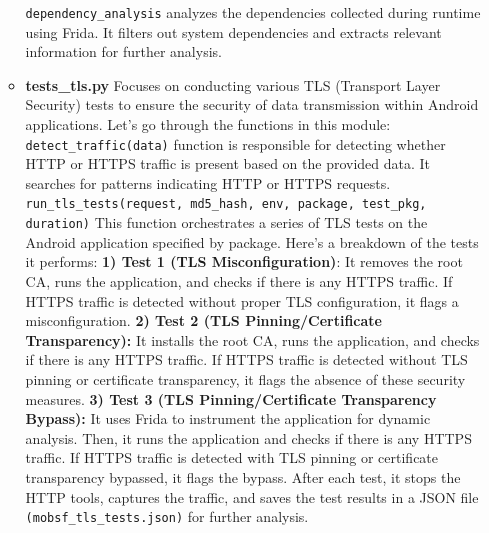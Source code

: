 \documentclass{report}
\begin{document}
\begin{itemize}
\begin{itemize}
        \texttt{dependency\_analysis} analyzes the dependencies collected during runtime using Frida. It filters out system dependencies and extracts relevant information for further analysis.
        \item \textbf {tests\_tls.py}
        Focuses on conducting various TLS (Transport Layer Security) tests to ensure the security of data transmission within Android applications. Let's go through the functions in this module:
        \texttt{detect\_traffic(data)} function is responsible for detecting whether HTTP or HTTPS traffic is present based on the provided data. It searches for patterns indicating HTTP or HTTPS requests. 
        \texttt{run\_tls\_tests(request, md5\_hash, env, package, test\_pkg, duration)} This function orchestrates a series of TLS tests on the Android application specified by package. Here's a breakdown of the tests it performs: \newline   
        \textbf{1) Test 1 (TLS Misconfiguration)}: It removes the root CA, runs the application, and checks if there is any HTTPS traffic. If HTTPS traffic is detected without proper TLS configuration, it flags a misconfiguration. \newline
        \textbf{2) Test 2 (TLS Pinning/Certificate Transparency):} It installs the root CA, runs the application, and checks if there is any HTTPS traffic. If HTTPS traffic is detected without TLS pinning or certificate transparency, it flags the absence of these security measures. \newline
        \textbf{3) Test 3 (TLS Pinning/Certificate Transparency Bypass):} It uses Frida to instrument the application for dynamic analysis. Then, it runs the application and checks if there is any HTTPS traffic. If HTTPS traffic is detected with TLS pinning or certificate transparency bypassed, it flags the bypass. \newline
        After each test, it stops the HTTP tools, captures the traffic, and saves the test results in a JSON file \texttt{(mobsf\_tls\_tests.json)} for further analysis.


\end{itemize}
\end{itemize}
\end{document}
